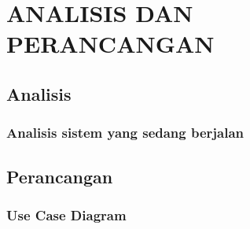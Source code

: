 \chapter{ANALISIS DAN PERANCANGAN}
\label{sec:analisi_dan_perancangan}

\section{Analisis}


\subsection{Analisis sistem yang sedang berjalan}


\section{Perancangan}


\subsection{Use Case Diagram}


